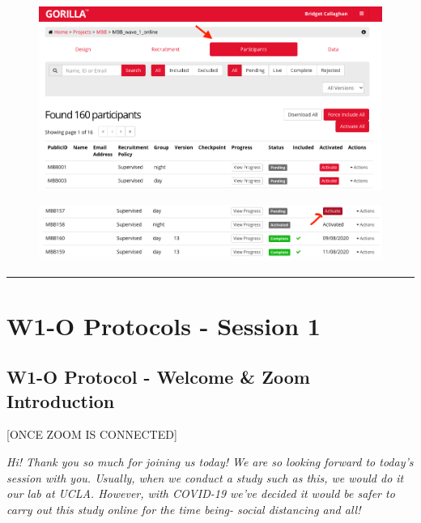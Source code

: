 \documentclass[]{book}
\begin{document}
\begin{figure}
\centering
\includegraphics{images/gorilla/4.png}
\caption{}
\end{figure}

\begin{figure}
\centering
\includegraphics{images/gorilla/5.png}
\caption{}
\end{figure}

\begin{center}\rule{0.5\linewidth}{0.5pt}\end{center}

\hypertarget{w1-o-protocols---session-1}{%
\section{W1-O Protocols - Session 1}\label{w1-o-protocols---session-1}}

\hypertarget{w1-o-protocol---welcome-zoom-introduction}{%
\subsection{W1-O Protocol - Welcome \& Zoom Introduction}\label{w1-o-protocol---welcome-zoom-introduction}}

{[}ONCE ZOOM IS CONNECTED{]}

\emph{Hi! Thank you so much for joining us today! We are so looking forward to today's session with you. Usually, when we conduct a study such as this, we would do it our lab at UCLA. However, with COVID-19 we've decided it would be safer to carry out this study online for the time being- social distancing and all!}
\end{document}

